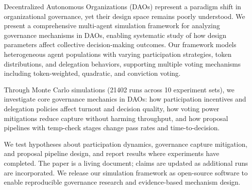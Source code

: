 
Decentralized Autonomous Organizations (DAOs) represent a paradigm shift in organizational governance, yet their design space remains poorly understood. We present a comprehensive multi-agent simulation framework for analyzing governance mechanisms in DAOs, enabling systematic study of how design parameters affect collective decision-making outcomes. Our framework models heterogeneous agent populations with varying participation strategies, token distributions, and delegation behaviors, supporting multiple voting mechanisms including token-weighted, quadratic, and conviction voting.

Through Monte Carlo simulations (21402 runs across 10 experiment sets), we investigate core governance mechanics in DAOs: how participation incentives and delegation policies affect turnout and decision quality, how voting power mitigations reduce capture without harming throughput, and how proposal pipelines with temp-check stages change pass rates and time-to-decision.

We test hypotheses about participation dynamics, governance capture mitigation, and proposal pipeline design, and report results where experiments have completed. The paper is a living document; claims are updated as additional runs are incorporated. We release our simulation framework as open-source software to enable reproducible governance research and evidence-based mechanism design.


